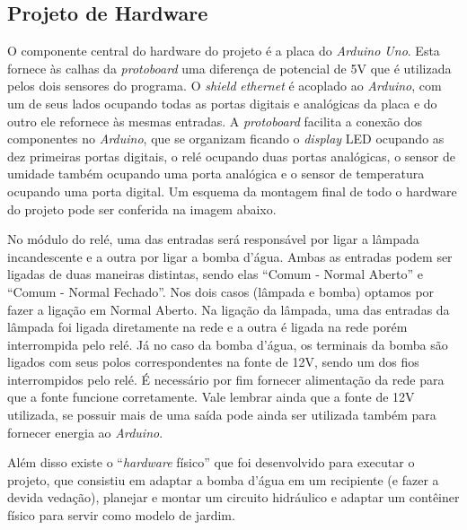 \documentclass[a4paper,12pt]{article}
\begin{document}
\subsection{Projeto de Hardware}

    O componente central do hardware do projeto é a placa do \textit{Arduino Uno}. Esta fornece às calhas da \textit{protoboard} uma diferença de potencial de 5V que é utilizada pelos dois sensores do programa. O \textit{shield} \textit{ethernet} é acoplado ao \textit{Arduino}, com um de seus lados ocupando todas as portas digitais e analógicas da placa e do outro ele refornece às mesmas entradas. A \textit{protoboard} facilita a conexão dos componentes no \textit{Arduino}, que se organizam ficando o \textit{display} LED ocupando as dez primeiras portas digitais, o relé ocupando duas portas analógicas, o sensor de umidade também ocupando uma porta analógica e o sensor de temperatura ocupando uma porta digital. Um esquema da montagem final de todo o hardware do projeto pode ser conferida na imagem abaixo.

    No módulo do relé, uma das entradas será responsável por ligar a lâmpada incandescente e a outra por ligar a bomba d’água. Ambas as entradas podem ser ligadas de duas maneiras distintas, sendo elas “Comum - Normal Aberto” e “Comum - Normal Fechado”. Nos dois casos (lâmpada e bomba) optamos por fazer a ligação em Normal Aberto. Na ligação da lâmpada, uma das entradas da lâmpada foi ligada diretamente na rede e a outra é ligada na rede porém interrompida pelo relé. Já no caso da bomba d’água, os terminais da bomba são ligados com seus polos correspondentes na fonte de 12V, sendo um dos fios interrompidos pelo relé. É necessário por fim fornecer alimentação da rede para que a fonte funcione corretamente. Vale lembrar ainda que a fonte de 12V utilizada, se possuir mais de uma saída pode ainda ser utilizada também para fornecer energia ao \textit{Arduino}.

    Além disso existe o “\textit{hardware} físico” que foi desenvolvido para executar o projeto, que consistiu em adaptar a bomba d’água em um recipiente (e fazer a devida vedação), planejar e montar um circuito hidráulico e adaptar um contêiner físico para servir como modelo de jardim.
\end{document}
